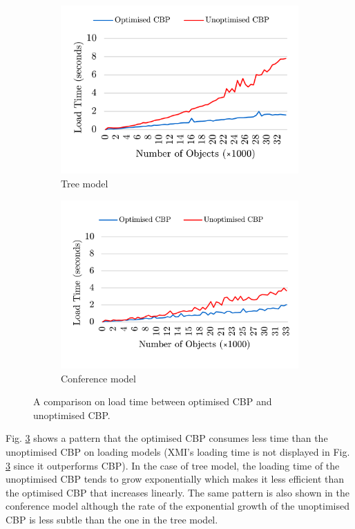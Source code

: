 \documentclass{llncs}
\begin{document}
\begin{figure}	
	\begin{subfigure}[t]{0.5\linewidth}
		\includegraphics[width=\linewidth]{loading_speed_tree}
		\caption{Tree model}\label{fig:append_speed_tree}		
	\end{subfigure}
	\hfill
	\begin{subfigure}[t]{0.5\linewidth}
		\includegraphics[width=\linewidth]{loading_speed_conf}
		\caption{Conference model}\label{fig:append_speed_conference}
	\end{subfigure}
	\caption{A comparison on load time between optimised CBP and unoptimised CBP.}
	\label{fig:loading_speed}
\end{figure}

Fig. \ref{fig:loading_speed} shows a pattern that the optimised CBP consumes less time than the unoptimised CBP on loading models (XMI's loading time is not displayed in Fig. \ref{fig:loading_speed} since it outperforms CBP). In the case of tree model, the loading time of the unoptimised CBP tends to grow exponentially which makes it less efficient than the optimised CBP that increases linearly. The same pattern is also shown in the conference model although the rate of the exponential growth of the unoptimised CBP is less subtle than the one in the tree model. 
\end{document}
